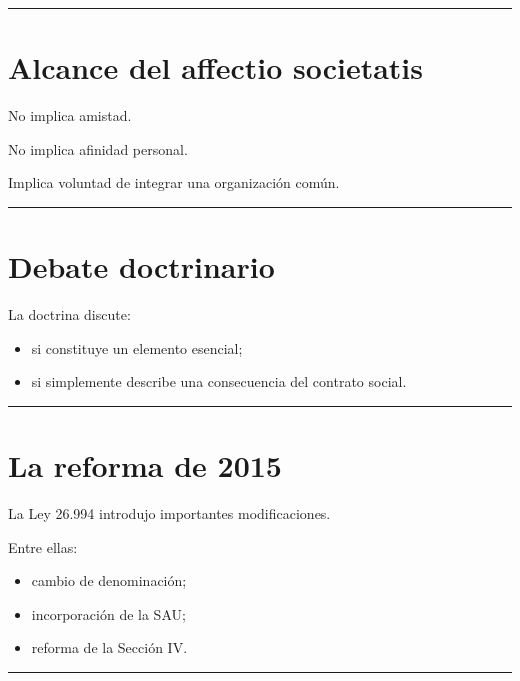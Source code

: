 \documentclass[
  spanish,
  letterpaper,
  DIV=11,
  numbers=noendperiod]{scrartcl}
\providecommand{\tightlist}{%
  \setlength{\itemsep}{0pt}\setlength{\parskip}{0pt}}
\begin{document}
\begin{center}\rule{0.5\linewidth}{0.5pt}\end{center}

\section{Alcance del affectio
societatis}\label{alcance-del-affectio-societatis}

No implica amistad.

No implica afinidad personal.

Implica voluntad de integrar una organización común.

\begin{center}\rule{0.5\linewidth}{0.5pt}\end{center}

\section{Debate doctrinario}\label{debate-doctrinario}

La doctrina discute:

\begin{itemize}
\tightlist
\item
  si constituye un elemento esencial;
\item
  si simplemente describe una consecuencia del contrato social.
\end{itemize}

\begin{center}\rule{0.5\linewidth}{0.5pt}\end{center}

\section{La reforma de 2015}\label{la-reforma-de-2015}

La Ley 26.994 introdujo importantes modificaciones.

Entre ellas:

\begin{itemize}
\tightlist
\item
  cambio de denominación;
\item
  incorporación de la SAU;
\item
  reforma de la Sección IV.
\end{itemize}

\begin{center}\rule{0.5\linewidth}{0.5pt}\end{center}
\end{document}
